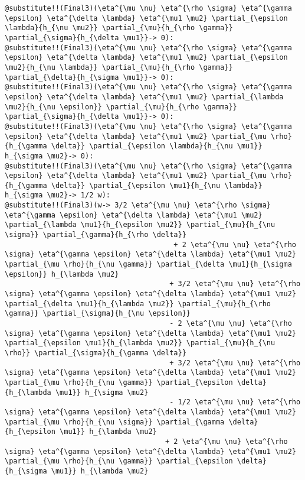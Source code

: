 \documentclass[11pt]{article}
\begin{document}
{\begin{verbatim}
@substitute!!(Final3)(\eta^{\mu \nu} \eta^{\rho \sigma} \eta^{\gamma \epsilon} \eta^{\delta \lambda} \eta^{\mu1 \mu2} \partial_{\epsilon \lambda}{h_{\nu \mu2}} \partial_{\mu}{h_{\rho \gamma}} \partial_{\sigma}{h_{\delta \mu1}}-> 0):
@substitute!!(Final3)(\eta^{\mu \nu} \eta^{\rho \sigma} \eta^{\gamma \epsilon} \eta^{\delta \lambda} \eta^{\mu1 \mu2} \partial_{\epsilon \mu2}{h_{\nu \lambda}} \partial_{\mu}{h_{\rho \gamma}} \partial_{\delta}{h_{\sigma \mu1}}-> 0):
@substitute!!(Final3)(\eta^{\mu \nu} \eta^{\rho \sigma} \eta^{\gamma \epsilon} \eta^{\delta \lambda} \eta^{\mu1 \mu2} \partial_{\lambda \mu2}{h_{\nu \epsilon}} \partial_{\mu}{h_{\rho \gamma}} \partial_{\sigma}{h_{\delta \mu1}}-> 0):
@substitute!!(Final3)(\eta^{\mu \nu} \eta^{\rho \sigma} \eta^{\gamma \epsilon} \eta^{\delta \lambda} \eta^{\mu1 \mu2} \partial_{\mu \rho}{h_{\gamma \delta}} \partial_{\epsilon \lambda}{h_{\nu \mu1}} h_{\sigma \mu2}-> 0):
@substitute!!(Final3)(\eta^{\mu \nu} \eta^{\rho \sigma} \eta^{\gamma \epsilon} \eta^{\delta \lambda} \eta^{\mu1 \mu2} \partial_{\mu \rho}{h_{\gamma \delta}} \partial_{\epsilon \mu1}{h_{\nu \lambda}} h_{\sigma \mu2}-> 1/2 w):
@substitute!!(Final3)(w-> 3/2 \eta^{\mu \nu} \eta^{\rho \sigma} \eta^{\gamma \epsilon} \eta^{\delta \lambda} \eta^{\mu1 \mu2} \partial_{\lambda \mu1}{h_{\epsilon \mu2}} \partial_{\mu}{h_{\nu \sigma}} \partial_{\gamma}{h_{\rho \delta}}
                                        + 2 \eta^{\mu \nu} \eta^{\rho \sigma} \eta^{\gamma \epsilon} \eta^{\delta \lambda} \eta^{\mu1 \mu2} \partial_{\mu \rho}{h_{\nu \gamma}} \partial_{\delta \mu1}{h_{\sigma \epsilon}} h_{\lambda \mu2} 
                                       + 3/2 \eta^{\mu \nu} \eta^{\rho \sigma} \eta^{\gamma \epsilon} \eta^{\delta \lambda} \eta^{\mu1 \mu2} \partial_{\delta \mu1}{h_{\lambda \mu2}} \partial_{\mu}{h_{\rho \gamma}} \partial_{\sigma}{h_{\nu \epsilon}}
                                       - 2 \eta^{\mu \nu} \eta^{\rho \sigma} \eta^{\gamma \epsilon} \eta^{\delta \lambda} \eta^{\mu1 \mu2} \partial_{\epsilon \mu1}{h_{\lambda \mu2}} \partial_{\mu}{h_{\nu \rho}} \partial_{\sigma}{h_{\gamma \delta}}
                                       + 3/2 \eta^{\mu \nu} \eta^{\rho \sigma} \eta^{\gamma \epsilon} \eta^{\delta \lambda} \eta^{\mu1 \mu2} \partial_{\mu \rho}{h_{\nu \gamma}} \partial_{\epsilon \delta}{h_{\lambda \mu1}} h_{\sigma \mu2}
                                       - 1/2 \eta^{\mu \nu} \eta^{\rho \sigma} \eta^{\gamma \epsilon} \eta^{\delta \lambda} \eta^{\mu1 \mu2} \partial_{\mu \rho}{h_{\nu \sigma}} \partial_{\gamma \delta}{h_{\epsilon \mu1}} h_{\lambda \mu2}
                                      + 2 \eta^{\mu \nu} \eta^{\rho \sigma} \eta^{\gamma \epsilon} \eta^{\delta \lambda} \eta^{\mu1 \mu2} \partial_{\mu \rho}{h_{\nu \gamma}} \partial_{\epsilon \delta}{h_{\sigma \mu1}} h_{\lambda \mu2}

\end{verbatim}}
\end{document}
